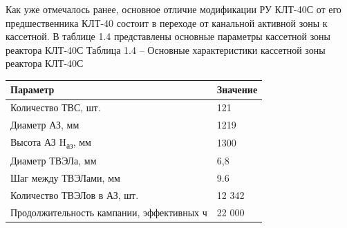Как уже отмечалось ранее, основное отличие модификации РУ КЛТ-40С от его
предшественника КЛТ-40 состоит в переходе от канальной активной зоны к
кассетной. В таблице 1.4 представлены основные параметры кассетной зоны
реактора КЛТ-40С
\clearpage
Таблица 1.4 -- Основные характеристики кассетной зоны реактора КЛТ-40С

\begin{longtable}[]{@{}|l|l|@{}}
\toprule
Параметр & Значение\tabularnewline
\midrule
\endhead
Количество ТВС, шт. & 121\tabularnewline
Диаметр АЗ, мм & 1219\tabularnewline
Высота АЗ H\textsubscript{аз}, мм & 1300\tabularnewline
Диаметр ТВЭЛа, мм & 6,8\tabularnewline
Шаг между ТВЭЛами, мм & 9.6\tabularnewline
Количество ТВЭЛов в АЗ, шт. & 12 342\tabularnewline
Продолжительность кампании, эффективных ч & 22 000\tabularnewline
\bottomrule
\end{longtable}
